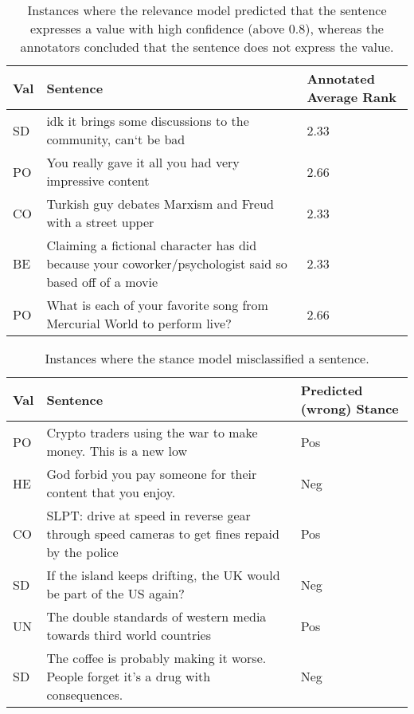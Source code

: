 \begin{table}

 \centering
 \resizebox{0.98\columnwidth}{!}
 {%
 \fontsize{8}{8}\selectfont
 
 \begin{tabular}{lp{4cm}p{1.5cm}}
 \toprule
 \textbf{Val} & \textbf{Sentence}  & \textbf{Annotated Average Rank} \\ 
 \midrule
SD & idk it brings some discussions to the community, can`t be bad & 2.33 \\
PO & You really gave it all you had very impressive content  & 2.66 \\
CO & Turkish guy debates Marxism and Freud with a street upper & 2.33 \\ 
BE & Claiming a fictional character has did because your coworker/psychologist said so based off of a movie & 2.33 \\
PO & What is each of your favorite song from Mercurial World to perform live? & 2.66 \\
 \bottomrule
 \end{tabular}
}

\caption{Instances where the relevance model predicted that the sentence expresses a value with high confidence (above 0.8), whereas the annotators concluded that the sentence does not express the value.}
\label{tab:rel_misclassification}
\end{table}


\begin{table}

 \centering
 \resizebox{0.98\columnwidth}{!}
 {%
 \fontsize{8}{8}\selectfont
 
 \begin{tabular}{lp{4cm}p{1.5cm}}
 \toprule
 \textbf{Val} & \textbf{Sentence}  & \textbf{Predicted (wrong) Stance} \\ 
 \midrule
PO & Crypto traders using the war to make money. This is a new low & Pos \\
HE & God forbid you pay someone for their content that you enjoy.  & Neg \\
CO &SLPT: drive at speed in reverse gear through speed cameras to get fines repaid by the police & Pos \\ 
SD & If the island keeps drifting, the UK would be part of the US again? & Neg \\
UN &The double standards of western media towards third world countries & Pos \\
SD & The coffee is probably making it worse. People forget it’s a drug with consequences. & Neg \\
 \bottomrule
 \end{tabular}
}

\caption{Instances where the stance model misclassified a sentence.}
\label{tab:stance_misclassification}
\end{table}
